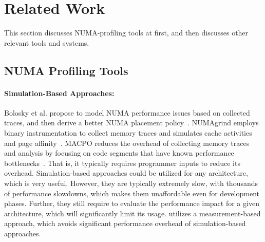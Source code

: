 \section{Related Work}
\label{sec:related}

This section discusses NUMA-profiling tools at first, and then discusses other relevant tools and systems.
\subsection{NUMA Profiling Tools} 



\paragraph{Simulation-Based Approaches:}
 Bolosky et al. propose to model NUMA performance issues based on collected traces, and then derive a better NUMA placement policy~\cite{Bolosky:1991:NPR:106972.106994}.
 NUMAgrind employs binary instrumentation to collect memory traces and simulates cache activities and page affinity~\cite{NUMAGrind}. MACPO reduces the overhead of collecting memory traces and analysis by focusing on code segments that have known performance bottlenecks~\cite{MACPO}. That is, it typically requires programmer inputs to reduce its overhead.  Simulation-based approaches could be utilized for any architecture, which is very useful. However, they are typically extremely slow, with thousands of performance slowdowns, which makes them unaffordable even for development phases. Further, they still require to evaluate the performance impact for a given architecture, which will significantly limit its usage. \NP{} utilizes a measurement-based approach, which avoids significant performance overhead of simulation-based approaches. 

